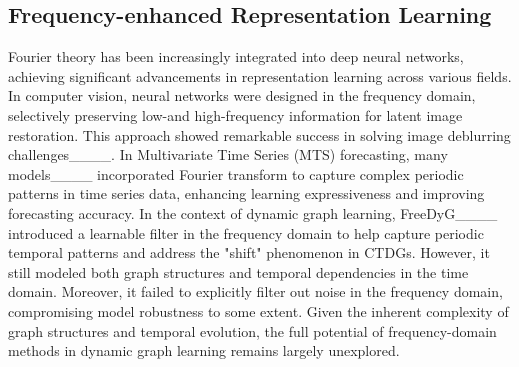 \subsection{Frequency-enhanced Representation Learning}  
Fourier theory has been increasingly integrated into deep neural networks, achieving significant advancements in representation learning across various fields. In computer vision, neural networks were designed in the frequency domain, selectively preserving low-and high-frequency information for latent image restoration. This approach showed remarkable success in solving image deblurring challenges____. In Multivariate Time Series (MTS) forecasting, many models____ incorporated Fourier transform to capture complex periodic patterns in time series data, enhancing learning expressiveness and improving forecasting accuracy. In the context of dynamic graph learning, FreeDyG____ introduced a learnable filter in the frequency domain to help capture periodic temporal patterns and address the "shift" phenomenon in CTDGs. However, it still modeled both graph structures and temporal dependencies in the time domain. Moreover, it failed to explicitly filter out noise in the frequency domain, compromising model robustness to some extent. Given the inherent complexity of graph structures and temporal evolution, the full potential of frequency-domain methods in dynamic graph learning remains largely unexplored.



